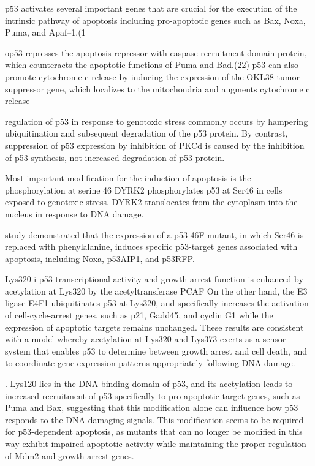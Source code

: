 p53 activates several important genes that are crucial for the execution of the intrinsic pathway of apoptosis including pro-apoptotic genes such as Bax, Noxa, Puma, and Apaf–1.(1

op53 represses the apoptosis repressor with caspase recruitment domain protein, which counteracts the apoptotic functions of Puma and Bad.(22) p53 can also promote cytochrome c release by inducing the expression of the OKL38 tumor suppressor gene, which localizes to the mitochondria and augments cytochrome c release


regulation of p53 in response to genotoxic stress commonly occurs by hampering ubiquitination and subsequent degradation of the p53 protein. By contrast, suppression of p53 expression by inhibition of PKCd is caused by the inhibition of p53 synthesis, not increased degradation of p53 protein.



 Most important modiﬁcation for the induction of apoptosis is the phosphorylation at serine 46 
  DYRK2 phosphorylates p53 at Ser46 in cells exposed to genotoxic stress.
  DYRK2 translocates from the cytoplasm into the nucleus in response to DNA damage.


  study demonstrated that the expression of a p53-46F mutant, in which Ser46 is replaced with phenylalanine, induces speciﬁc p53-target genes associated with apoptosis, including Noxa, p53AIP1, and p53RFP.


  Lys320 
  i p53 transcriptional activity and growth arrest function is enhanced by acetylation at Lys320 by the acetyltransferase PCAF
  On the other hand, the E3 ligase E4F1 ubiquitinates p53 at Lys320, and speciﬁcally increases the activation of cell-cycle-arrest genes, such as p21, Gadd45, and cyclin G1 while the expression of apoptotic targets remains unchanged.
  These results are consistent with a model whereby acetylation at Lys320 and Lys373 exerts as a sensor system that enables p53 to determine between growth arrest and cell death, and to coordinate gene expression patterns appropriately following DNA damage.



. Lys120 lies in the DNA-binding domain of p53, and its acetylation leads to increased recruitment of p53 speciﬁcally to pro-apoptotic target genes, such as Puma and Bax, suggesting that this modiﬁcation alone can inﬂuence how p53 responds to the DNA-damaging signals. This modiﬁcation seems to be required for p53-dependent apoptosis, as mutants that can no longer be modiﬁed in this way exhibit impaired apoptotic activity while maintaining the proper regulation of Mdm2 and growth-arrest genes.





